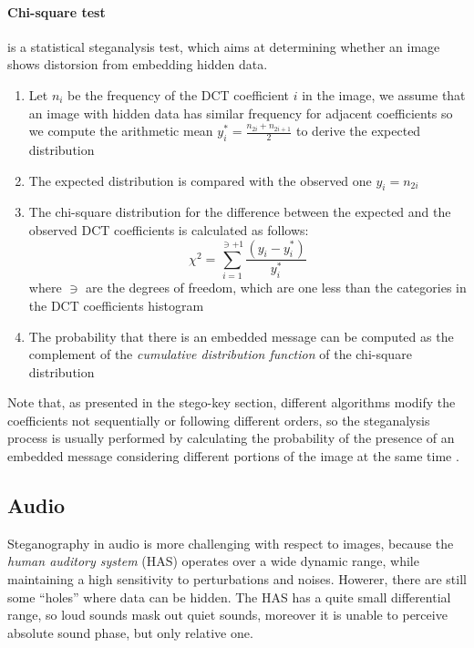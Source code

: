 \documentclass[../../main.tex]{subfiles}
\begin{document}
    \paragraph{Chi-square test} is a statistical steganalysis test, which aims
    at determining whether an image shows distorsion from embedding hidden data.
    \begin{enumerate}
        \item Let $n_i$ be the frequency of the DCT coefficient $i$ in the
            image, we assume that an image with hidden data has similar
            frequency for adjacent coefficients so we compute the arithmetic
            mean $y_{i}^{*} = \frac{n_{2i}+n_{2i+1}}{2}$ to derive the expected
            distribution
        \item The expected distribution is compared with the observed one
            $y_i = n_{2i}$
        \item The chi-square distribution for the difference between the
            expected and the observed DCT coefficients is calculated as follows:
            $$ \chi^2 = \sum_{i=1}^{\ni+1}
            \frac{\left( y_i-y_{i}^{*}\right)}{y_{i}^{*}}$$
            where $\ni$ are the degrees of freedom, which are one less than the
            categories in the DCT coefficients histogram
        \item The probability that there is an embedded message can be computed
            as the complement of the \emph{cumulative distribution function} of
            the chi-square distribution
    \end{enumerate}
    Note that, as presented in the stego-key section, different algorithms
    modify the coefficients not sequentially or following different orders, so
    the steganalysis process is usually performed by calculating the probability
    of the presence of an embedded message considering different portions of the
    image at the same time \cite{jpeg-image-internet}.
    


    \subsection{Audio}
    Steganography in audio is more challenging with respect to images, because
    the \emph{human auditory system} (HAS) operates over a wide dynamic range,
    while maintaining a high sensitivity to perturbations and noises.
    Howerer, there are still some ``holes'' where data can be hidden.
    The HAS has a quite small differential range, so loud sounds mask out quiet
    sounds, moreover it is unable to perceive absolute sound phase, but only
    relative one.
\end{document}
